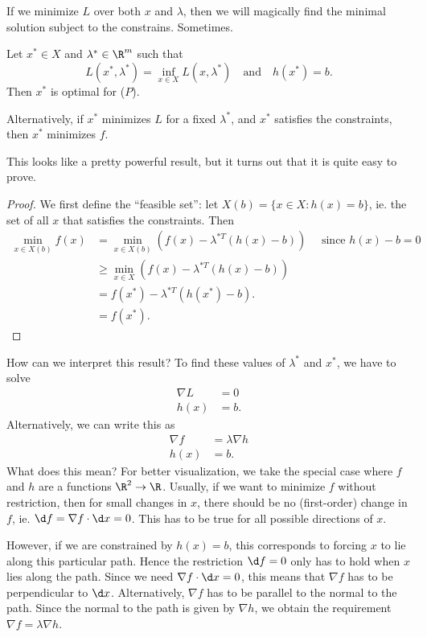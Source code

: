 \documentclass[a4paper]{article}
\begin{document}
If we minimize $L$ over both $x$ and $\lambda$, then we will magically find the minimal solution subject to the constrains. Sometimes.

\begin{thm}
  Let $x^*\in X$ and $\lambda^*\in \R^m$ such that
  \[
    L(x^* ,\lambda^*) = \inf_{x\in X}L(x, \lambda^*)\quad\text{and}\quad h(x^*) = b.
  \]
  Then $x^*$ is optimal for ($P$).

  Alternatively, if $x^*$ minimizes $L$ for a fixed $\lambda^*$, and $x^*$ satisfies the constraints, then $x^*$ minimizes $f$.
\end{thm}
This looks like a pretty powerful result, but it turns out that it is quite easy to prove.

\begin{proof}
  We first define the ``feasible set'': let $X(b) = \{x\in X: h(x) = b\}$, ie. the set of all $x$ that satisfies the constraints. Then
  \begin{align*}
    \min_{x\in X(b)} f(x) &= \min_{x\in X(b)} (f(x) - \lambda^{*T}(h(x) - b))\quad\text{ since $h(x) - b = 0$}\\
    &\geq \min_{x\in X} (f(x) - \lambda^{*T}(h(x) - b))\\
    &= f(x^*) - \lambda^{*T}(h(x^*) - b).\\
    &= f(x^*).
  \end{align*}
\end{proof}
How can we interpret this result? To find these values of $\lambda^*$ and $x^*$, we have to solve
\begin{align*}
  \nabla L &= 0\\
  h(x) &= b.
\end{align*}
Alternatively, we can write this as
\begin{align*}
  \nabla f &= \lambda \nabla h\\
  h(x) &= b.
\end{align*}
What does this mean? For better visualization, we take the special case where $f$ and $h$ are a functions $\R^2 \to \R$. Usually, if we want to minimize $f$ without restriction, then for small changes in $x$, there should be no (first-order) change in $f$, ie. $\d f = \nabla f\cdot \d x = 0$. This has to be true for all possible directions of $x$.

However, if we are constrained by $h(x) = b$, this corresponds to forcing $x$ to lie along this particular path. Hence the restriction $\d f = 0$ only has to hold when $x$ lies along the path. Since we need $\nabla f\cdot \d x = 0$, this means that $\nabla f$ has to be perpendicular to $\d x$. Alternatively, $\nabla f$ has to be parallel to the normal to the path. Since the normal to the path is given by $\nabla h$, we obtain the requirement $\nabla f = \lambda \nabla h$.
\end{document}
